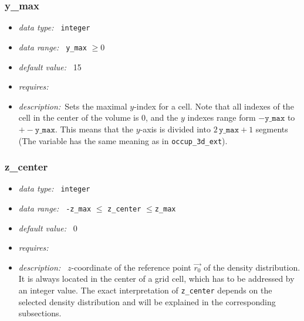 \documentclass[a4paper,10pt]{article}
\begin{document}
\subsubsection{y\_max}
\label{hydopt:ymax}
\begin{itemize}
 \item \textit{data type:~} \texttt{integer}
 \item \textit{data range:~} \texttt{y\_max} $\ge0$
 \item \textit{default value:~} 15
 \item \textit{requires:~}
 \item \textit{description:~}Sets the maximal $y$-index for a cell. Note that
  all indexes of the cell in the center of the volume is 0, and the  $y$ 
  indexes range form $-\mathtt{y\_max}$ to $+-\mathtt{y\_max}$. This means that 
  the $y$-axis is divided into $2\, \mathtt{y\_max} +1$ segments (The variable 
  has the same meaning as in \texttt{occup\_3d\_ext}).
\end{itemize}

\subsubsection{z\_center}
\label{hydopt:zcenter}
\begin{itemize}
 \item \textit{data type:~} \texttt{integer}
 \item \textit{data range:~} \texttt{-z\_max} $ \leq$ \texttt{z\_center} 
  $\leq $\texttt{z\_max} 
 \item \textit{default value:~} 0
 \item \textit{requires:~} 
 \item \textit{description:~} $z$-coordinate of the reference point $\vec{r_0}$
  of the density distribution.  It is always located in the center of a grid 
  cell, which has to be addressed by an integer value. 
  The exact interpretation of \texttt{z\_center} depends on the selected 
  density distribution and will be 
  explained in the corresponding subsections.
\end{itemize}
\end{document}
